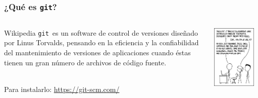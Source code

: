 \documentclass{beamer}
\newcommand{\git}{\texttt{git}}
\begin{document}
\begin{frame}\frametitle{¿Qué es \git?}
	\begin{columns}
		\begin{column}{0.5\textwidth}
			\begin{block}{Wikipedia}
				\git\ es un software de control de versiones diseñado por Linus Torvalds, pensando en la eficiencia y la confiabilidad del mantenimiento de versiones de aplicaciones cuando éstas tienen un gran número de archivos de código fuente.
			\end{block}
		\  \\
		
		Para instalarlo: \url{https://git-scm.com/}
		\end{column}
		\begin{column}{0.5\textwidth}
			\centering
			\includegraphics[width=0.9\textwidth]{fig/git}
		\end{column}
	\end{columns}
\end{frame}
\end{document}
